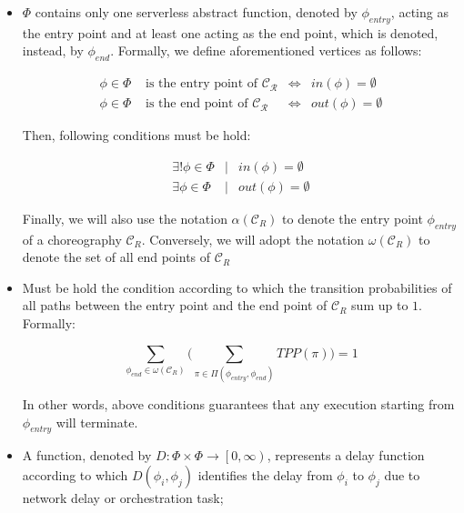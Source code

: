 \documentclass[10pt,a4paper]{report}
\theoremstyle{definition}
\begin{document}
\begin{itemize}
	\item $\Phi$ contains only one serverless abstract function, denoted by $\phi_{entry}$, acting as the entry point and at least one acting as the end point, which is denoted, instead, by $\phi_{end}$. Formally, we define aforementioned vertices as follows: 
	
	\begin{equation}
		\begin{array}{lcll}
			\phi \in \Phi & \text{ is the entry point of } \mathcal{C_R} & \Leftrightarrow & in(\phi) = \emptyset \\
			\phi \in \Phi & \text{ is the end point of } \mathcal{C_R} & \Leftrightarrow & out(\phi) = \emptyset
		\end{array}
	\end{equation}
	
	Then, following conditions must be hold:
	
	\begin{eqnarray}
		\exists !  \phi \in \Phi &\mid & in(\phi) = \emptyset \label{cond1} \\
		\exists   \phi \in \Phi & \mid & out(\phi) = \emptyset \label{cond2}
	\end{eqnarray}
	
	Finally, we will also use the notation $\alpha(\mathcal{C}_R)$ to denote the entry point $\phi_{entry}$ of a choreography $\mathcal{C}_R$. Conversely, we will adopt the notation $\omega(\mathcal{C}_R)$ to denote the set of all end points of $\mathcal{C}_R$
	
	\item Must be hold the condition according to which the transition probabilities of all paths between the entry point and	the end point of $\mathcal{C}_R$ sum up to $1$. Formally:
	
	\begin{equation}\label{cond3}
		\sum_{\phi_{end} \in \omega(\mathcal{C}_R)} \Big( \sum_{\pi \in \Pi(\phi_{entry}, \phi_{end})} TPP(\pi) \Big) = 1
	\end{equation}
	
	In other words, above conditions guarantees that any execution starting from $\phi_{entry}$ will terminate.
	
	\item A function, denoted by $D : \Phi \times \Phi \to \left[ 0, \infty \right)$, represents a delay function according to which $D\left(\phi_i, \phi_j \right)$ identifies the delay from $\phi_i$ to $\phi_j$ due to network delay or orchestration task;  
	
\end{itemize} 
\end{document}
